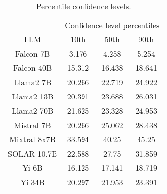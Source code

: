 \begin{table*}
\centering
\begin{tabular}{c|c|c|c}
& \multicolumn{3}{c}{Confidence level percentiles} \\ 
LLM & 10th & 50th & 90th\\ \hline
Falcon 7B & 3.176 & 4.258 & 5.254\\
Falcon 40B & 15.312 & 16.438 & 18.641\\
Llama2 7B & 20.266 & 22.719 & 24.922\\
Llama2 13B & 20.391 & 23.688 & 26.031\\
Llama2 70B & 21.625 & 23.328 & 24.953\\
Mistral 7B & 20.266 & 25.062 & 28.438\\
Mixtral 8x7B & 33.594 & 40.25 & 45.25\\
SOLAR 10.7B & 22.588 & 27.75 & 31.859\\
Yi 6B & 16.125 & 17.141 & 18.719\\
Yi 34B & 20.297 & 21.953 & 23.391\\
\hline
\end{tabular}
\caption{Percentile confidence levels.}
\label{tab:percentile_conf}
\end{table*}
